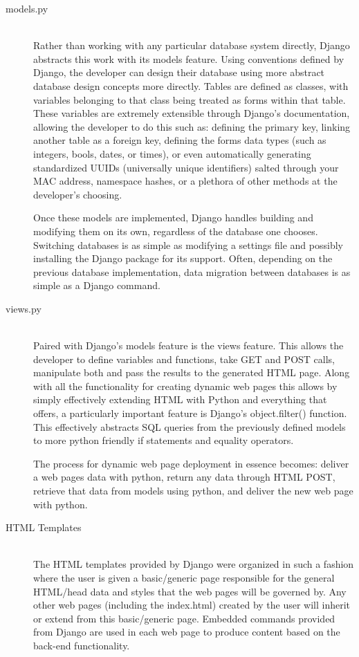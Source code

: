 \documentclass[sigconf]{acmart}
\begin{document}
\hspace{1em}\begin{description}
	\item[models.py] \hfill \\
	Rather than working with any particular database system directly, Django abstracts this work with its models feature. Using conventions defined by Django, the developer can design their database using more abstract database design concepts more directly. Tables are defined as classes, with variables belonging to that class being treated as forms within that table. These variables are extremely extensible through Django's documentation, allowing the developer to do this such as: defining the primary key, linking another table as a foreign key, defining the forms data types (such as integers, bools, dates, or times), or even automatically generating standardized UUIDs (universally unique identifiers) salted through your MAC address, namespace hashes, or a plethora of other methods at the developer's choosing. \par
	Once these models are implemented, Django handles building and modifying them on its own, regardless of the database one chooses. Switching databases is as simple as modifying a settings file and possibly installing the Django package for its support. Often, depending on the previous database implementation, data migration between databases is as simple as a Django command.
\pagebreak
	\item[views.py] \hfill \\
	Paired with Django's models feature is the views feature. This allows the developer to define variables and functions, take GET and POST calls, manipulate both and pass the results to the generated HTML page. Along with all the functionality for creating dynamic web pages this allows by simply effectively extending HTML with Python and everything that offers, a particularly important feature is Django's object.filter() function. This effectively abstracts SQL queries from the previously defined models to more python friendly if statements and equality operators. \par
	The process for dynamic web page deployment in essence becomes: deliver a web pages data with python, return any data through HTML POST, retrieve that data from models using python, and deliver the new web page with python.
	\item[HTML Templates] \hfill \\
	The HTML templates provided by Django were organized in such a fashion where the user is given a basic/generic
	page responsible for the general HTML/head data and styles that the web pages will be governed by. Any other web pages (including the index.html) created by the user will inherit or extend from this basic/generic page. Embedded commands provided from Django are used in each web page to produce content based on the back-end functionality.
\end{description}
\end{document}
